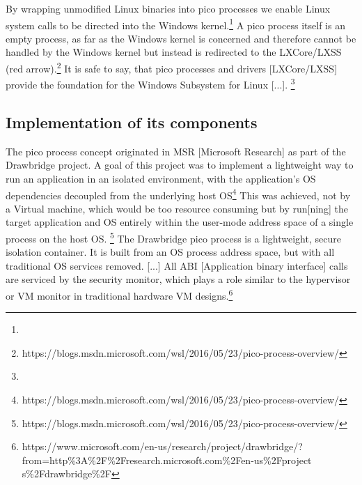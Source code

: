 \documentclass[utf8,biblatex]{lni}
\begin{document}
\glqq By wrapping unmodified Linux binaries into pico processes we enable Linux system calls to be directed into the Windows kernel.\grqq \footnote{} A pico process itself is an empty process, as far as the Windows kernel is concerned and therefore cannot be handled by the Windows kernel but instead is redirected to the LXCore/LXSS (red arrow).\footnote{https://blogs.msdn.microsoft.com/wsl/2016/05/23/pico-process-overview/}
It is safe to say, that \glqq pico processes and drivers [LXCore/LXSS] provide the foundation for the Windows Subsystem for Linux [...]. \grqq \footnote{}

\subsection{Implementation of its components}

\glqq The pico process concept originated in MSR [Microsoft Research] as part of the Drawbridge project. A goal of this project was to implement a lightweight way to run an application in an isolated environment, with the application’s OS dependencies decoupled from the underlying host OS\glqq \footnote{https://blogs.msdn.microsoft.com/wsl/2016/05/23/pico-process-overview/} This was achieved, not by a Virtual machine, which would be too resource consuming but by \glqq run[ning] the target application and OS entirely within the user-mode address space of a single process on the host OS. \glqq \footnote{https://blogs.msdn.microsoft.com/wsl/2016/05/23/pico-process-overview/} \glqq The Drawbridge pico process is a lightweight, secure isolation container. It is built from an OS process address space, but with all traditional OS services removed. [...] All ABI [Application binary interface] calls are serviced by the security monitor, which plays a role similar to the hypervisor or VM monitor in traditional hardware VM designs.\glqq \footnote{https://www.microsoft.com/en-us/research/project/drawbridge/?from=http\%3A\%2F\%2Fresearch.microsoft.com\%2Fen-us\%2Fproject s\%2Fdrawbridge\%2F}
\end{document}
